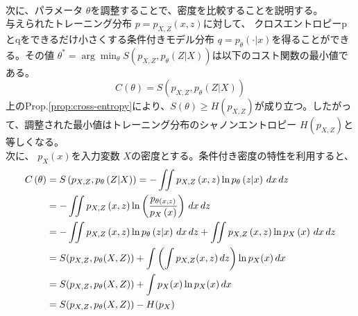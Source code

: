 \documentclass[a4paper]{jsarticle}%
\begin{document}
\\
次に、パラメータ $ \theta $を調整することで、密度を比較することを説明する。\\
与えられたトレーニング分布 $ p = p_{X,Z} \left(x,z\right) $に対して、
クロスエントロピーpとqをできるだけ小さくする条件付きモデル分布 $ q = p_{\theta} \left(\cdot|x\right)$を得ることができる。その値 $ \theta^* = \arg\min_{\theta} S \left(p_{X,Z},p_{\theta} \left(Z|X\right)\right) $は以下のコスト関数の最小値である。
\begin{equation*}
  C \left(\theta\right) = S \left(p_{X,Z},p_{\theta} \left(Z|X\right)\right) 
\end{equation*}
上のProp.\ref{prop:cross-entropy}により、$S \left(\theta\right) \geq H \left(p_{X,Z}\right)$が成り立つ。したがって、調整された最小値はトレーニング分布のシャノンエントロピー $ H \left(p_{X,Z}\right) $と等しくなる。\\
次に、 $ p_{X} \left(x\right)$を入力変数 $ X $の密度とする。条件付き密度の特性を利用すると、
\begin{align}
  C \left(\theta\right) &= S \left(p_{X,Z}, p_{\theta} \left(Z|X\right)\right)= -\iint p_{X,Z} \left(x, z\right) \ln p_\theta \left(z|x\right) \, dx \, dz\notag\\
  &= -\iint p_{X,Z} \left(x,z\right)\ln \left(\dfrac{p_{\theta \left(x,z\right)}}{p_{X} \left(x\right)}\right)\, dx \, dz\notag \\
  &= -\iint p_{X,Z} \left(x,z\right)\ln p_{\theta} \left(z|x\right) \, dx \, dz + \iint p_{X,Z} \left(x,z\right)\ln p_{X} \left(x\right) \, dx \, dz\notag\\
  &= S(p_{X,Z}, p_\theta(X,Z)) + \int \left( \int p_{X,Z}(x, z) \, dz \right) \ln p_X(x) \, dx\label{proof}\\
  &= S(p_{X,Z}, p_\theta(X,Z)) + \int p_X(x) \ln p_X(x) \, dx\notag\\
  &= S(p_{X,Z}, p_\theta(X,Z)) - H(p_{\scriptstyle X})\notag
\end{align}
\end{document}
